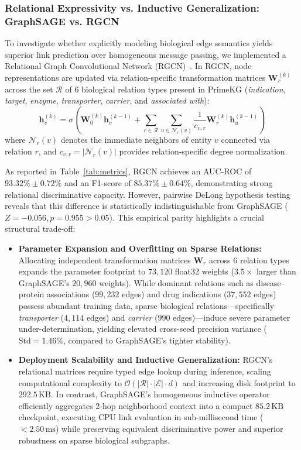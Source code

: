 \documentclass[conference,a4paper]{IEEEtran}
\begin{document}
\subsubsection{Relational Expressivity vs. Inductive Generalization: GraphSAGE vs. RGCN}
To investigate whether explicitly modeling biological edge semantics yields superior link prediction over homogeneous message passing, we implemented a Relational Graph Convolutional Network (RGCN)~\cite{ref_rgcn}. In RGCN, node representations are updated via relation-specific transformation matrices $\mathbf{W}_r^{(k)}$ across the set $\mathcal{R}$ of 6 biological relation types present in PrimeKG (\textit{indication}, \textit{target}, \textit{enzyme}, \textit{transporter}, \textit{carrier}, and \textit{associated with}):
\begin{equation}
\mathbf{h}_v^{(k)} = \sigma \left( \mathbf{W}_0^{(k)} \mathbf{h}_v^{(k-1)} + \sum_{r \in \mathcal{R}} \sum_{u \in \mathcal{N}_r(v)} \frac{1}{c_{v,r}} \mathbf{W}_r^{(k)} \mathbf{h}_u^{(k-1)} \right)
\end{equation}
where $\mathcal{N}_r(v)$ denotes the immediate neighbors of entity $v$ connected via relation $r$, and $c_{v,r} = |\mathcal{N}_r(v)|$ provides relation-specific degree normalization.

As reported in Table~\ref{tab:metrics}, RGCN achieves an AUC-ROC of $93.32\% \pm 0.72\%$ and an F1-score of $85.37\% \pm 0.64\%$, demonstrating strong relational discriminative capacity. However, pairwise DeLong hypothesis testing reveals that this difference is statistically indistinguishable from GraphSAGE ($Z = -0.056, p = 0.955 > 0.05$). This empirical parity highlights a crucial structural trade-off:
\begin{itemize}
    \item \textbf{Parameter Expansion and Overfitting on Sparse Relations:} Allocating independent transformation matrices $\mathbf{W}_r$ across 6 relation types expands the parameter footprint to $73,120$ float32 weights ($3.5\times$ larger than GraphSAGE's $20,960$ weights). While dominant relations such as disease--protein associations ($99,232$ edges) and drug indications ($37,552$ edges) possess abundant training data, sparse biological relations—specifically \textit{transporter} ($4,114$ edges) and \textit{carrier} ($990$ edges)—induce severe parameter under-determination, yielding elevated cross-seed precision variance ($\text{Std} = 1.46\%$, compared to GraphSAGE's tighter stability).
    \item \textbf{Deployment Scalability and Inductive Generalization:} RGCN's relational matrices require typed edge lookup during inference, scaling computational complexity to $\mathcal{O}(|\mathcal{R}| \cdot |\mathcal{E}| \cdot d)$ and increasing disk footprint to $292.5\,\mathrm{KB}$. In contrast, GraphSAGE's homogeneous inductive operator efficiently aggregates 2-hop neighborhood context into a compact $85.2\,\mathrm{KB}$ checkpoint, executing CPU link evaluation in sub-millisecond time ($<2.50\,\mathrm{ms}$) while preserving equivalent discriminative power and superior robustness on sparse biological subgraphs.
\end{itemize}
\end{document}
